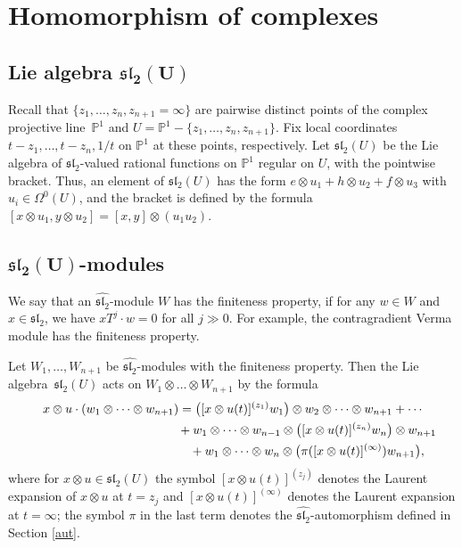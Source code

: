 \section{Homomorphism of complexes}\label{sec homs}

\subsection[Lie algebra $\mathfrak{sl}_2(U)$]{Lie algebra $\boldsymbol{\mathfrak{sl}_2(U)}$}\label{conf block}
Recall that $\{z_1,\dots,z_n,z_{n+1}=\infty\}$ are pairwise distinct points of the complex projective line~${\mathbb P}^1$ and $U={\mathbb P}^1 -\{z_1,\dots,z_n,z_{n+1}\}$. Fix local coordinates $t-z_1,\dots, t-z_n,1/t$ on ${\mathbb P}^1$ at these points, respectively.
Let $\mathfrak{sl}_2(U)$ be the Lie algebra of $\mathfrak{sl}_2$-valued rational functions on ${\mathbb P}^1$ regular on $U$, with the pointwise bracket. Thus, an element of $\mathfrak{sl}_2(U)$ has the form $e\otimes u_1 + h\otimes u_2+ f\otimes u_3$ with $u_i\in\Omega^0(U)$, and the bracket is defined by the formula $[x\otimes u_1, y\otimes u_2] = [x,y]\otimes (u_1u_2)$.

\subsection[$\mathfrak{sl}_2(U)$-modules]{$\boldsymbol{\mathfrak{sl}_2(U)}$-modules}
We say that an $\widehat{{\mathfrak{sl}_2}}$-module $W$ has the finiteness property, if for any $w\in W$ and $ x\in\mathfrak{sl}_2$, we have $xT^j \cdot w=0$ for all $j \gg 0$. For example, the contragradient Verma module has the finiteness property.

Let $W_1,\dots,W_{n+1}$ be $\widehat{{\mathfrak{sl}_2}}$-modules with the finiteness property. Then the Lie algebra~$\mathfrak{sl}_2(U)$ acts on $W_1\otimes\dots\otimes W_{n+1}$ by the formula
\begin{gather*}
x\otimes u \cdot (w_1\otimes\dots\otimes w_{n+1}) = \big([x\otimes u(t)]^{(z_1)} w_1\big)
\otimes w_2\otimes\dots\otimes w_{n+1}+ \cdots \nonumber\\
\hphantom{x\otimes u \cdot (w_1\otimes\dots\otimes w_{n+1}) =}{} + w_1\otimes\dots\otimes w_{n-1}\otimes \big([x\otimes u(t)]^{(z_n)} w_n\big)\otimes w_{n+1} \nonumber\\
\hphantom{x\otimes u \cdot (w_1\otimes\dots\otimes w_{n+1}) =}{} + w_1\otimes\dots\otimes w_n\otimes \big(\pi([x\otimes u(t)]^{(\infty)}) w_{n+1}\big), %
\end{gather*}
where for $x\otimes u \in\mathfrak{sl}_2(U)$ the symbol $[x\otimes u(t)]^{(z_j)}$ denotes the Laurent expansion of $x\otimes u$ at $t=z_j$ and $[x\otimes u(t)]^{(\infty)}$ denotes the Laurent expansion at $t=\infty$; the symbol $\pi$ in the last term denotes the $\widehat{{\mathfrak{sl}_2}}$-automorphism defined in Section \ref{aut}.

